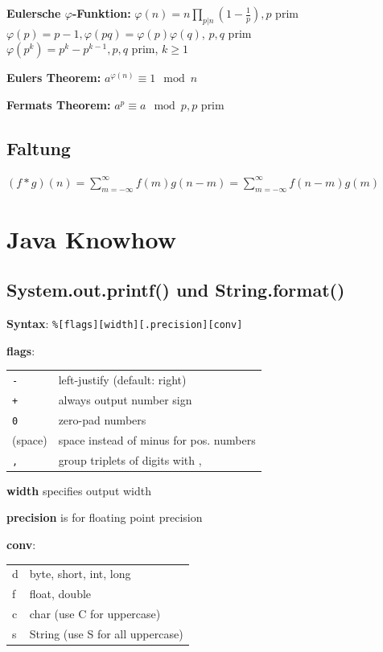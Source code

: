 \documentclass[10pt,a4paper,ngerman,oneside,]{article}
\begin{document}
\begin{multicols}{2}
\textbf{Eulersche $\varphi$-Funktion:} $\varphi(n)=n\prod_{p|n}(1-\frac{1}{p}),p$ prim\\
$\varphi(p)=p-1,\varphi(pq)=\varphi(p)\varphi(q)$, $p,q$ prim\\
$\varphi(p^k)=p^k-p^{k-1},p,q$ prim, $k\geq 1$

\textbf{Eulers Theorem:} $a^{\varphi(n)}\equiv 1\mod n$

\textbf{Fermats Theorem:} $a^{p}\equiv a\mod p, p$ prim

\subsection{Faltung}
$
(f\ast g)(n) = \sum\limits_{m=-\infty}^{\infty}f(m)g(n-m)=\sum\limits_{m=-\infty}^{\infty}f(n-m)g(m)
$




\section{Java Knowhow}
\subsection{System.out.printf() und String.format()}
\textbf{Syntax}: \texttt{\%[flags][width][.precision][conv]}

\textbf{flags}: \\ \begin{tabular}{ll}
  \texttt{-} & left-justify (default: right) \\
  \texttt{+} & always output number sign \\
  \texttt{0} & zero-pad numbers \\
  (space)    & space instead of minus for pos. numbers \\
  \texttt{,} & group triplets of digits with ,
\end{tabular}

\textbf{width} specifies output width

\textbf{precision} is for floating point precision

\textbf{conv}: \\ \begin{tabular}{ll}
  d & byte, short, int, long \\
  f & float, double \\
  c & char (use C for uppercase) \\
  s & String (use S for all uppercase)
\end{tabular}


\end{multicols}
\end{document}
